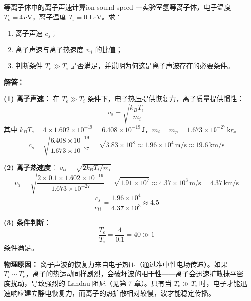\begin{example}{等离子体中的离子声速计算}{ion-sound-speed}
一实验室氢等离子体，电子温度 $T_e=4\,\mathrm{eV}$，离子温度 $T_i=0.1\,\mathrm{eV}$。求：
\begin{enumerate}[label=(\arabic*)]
\item 离子声速 $c_s$；
\item 离子声速与离子热速度 $v_{ti}$ 的比值；
\item 判断条件 $T_e\gg T_i$ 是否满足，并说明为何这是离子声波存在的必要条件。
\end{enumerate}
\tcblower
\textbf{解答：}

\textbf{(1) 离子声速：} 在 $T_e\gg T_i$ 条件下，电子热压提供恢复力，离子质量提供惯性：
\[
c_s = \sqrt{\frac{k_{\!B}T_e}{m_i}}
\]
其中 $k_{\!B}T_e = 4\times 1.602\times 10^{-19} = 6.408\times 10^{-19}\,\mathrm{J}$，$m_i = m_p = 1.673\times 10^{-27}\,\mathrm{kg}$。
\[
c_s = \sqrt{\frac{6.408\times 10^{-19}}{1.673\times 10^{-27}}} = \sqrt{3.83\times 10^8} \approx 1.96\times 10^4\,\mathrm{m/s} \approx 19.6\,\mathrm{km/s}
\]

\textbf{(2) 离子热速度：} $v_{ti} = \sqrt{2k_{\!B}T_i/m_i}$
\[
v_{ti} = \sqrt{\frac{2\times 0.1\times 1.602\times 10^{-19}}{1.673\times 10^{-27}}} = \sqrt{1.91\times 10^7} \approx 4.37\times 10^3\,\mathrm{m/s} = 4.37\,\mathrm{km/s}
\]
\[
\frac{c_s}{v_{ti}} = \frac{1.96\times 10^4}{4.37\times 10^3} \approx 4.5
\]

\textbf{(3) 条件判断：}
\[
\frac{T_e}{T_i} = \frac{4}{0.1} = 40 \gg 1
\]
条件满足。

\textbf{物理原因：} 离子声波的恢复力来自电子热压（通过准中性电场传递）。如果 $T_i\sim T_e$，离子的热运动同样剧烈，会破坏波的相干性——离子会迅速扩散抹平密度扰动，导致强烈的 Landau 阻尼（见第 7 章）。只有当 $T_e\gg T_i$ 时，电子才能迅速响应建立静电恢复力，而离子的热扩散相对较慢，波才能稳定传播。
\end{example}

